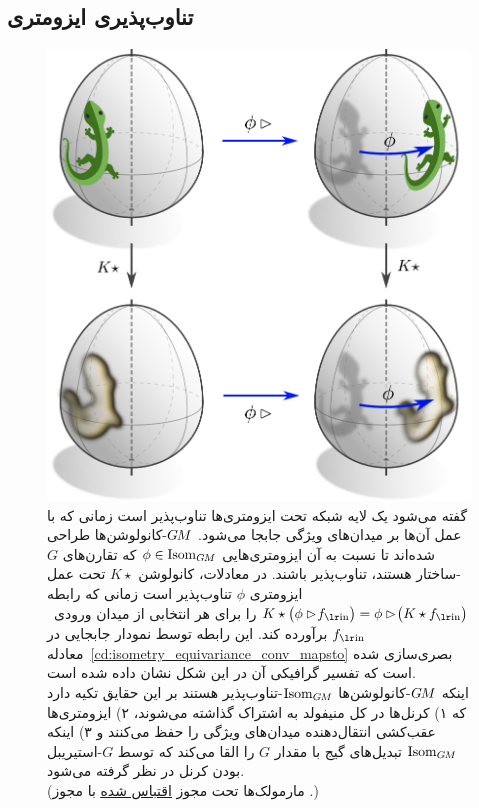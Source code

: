

\subsection{تناوب‌پذیری ایزومتری}
\label{sec:gauge_conv_isom_equiv}


\begin{figure}
	\centering
	\includegraphics[width=.56\textwidth]{figures/lizard_conv_egg.pdf}
	\captionsetup{width=.89\textwidth}
	\caption[]{\small
		گفته می‌شود یک لایه شبکه تحت ایزومتری‌ها تناوب‌پذیر است زمانی که با عمل آن‌ها بر میدان‌های ویژگی جابجا می‌شود.
		$G\mkern-1.4muM$-کانولوشن‌ها طراحی شده‌اند تا نسبت به آن ایزومتری‌هایی $\phi\in \operatorname{Isom}_{G\mkern-1.4muM}$ که تقارن‌های $G$-ساختار هستند، تناوب‌پذیر باشند.
		در معادلات، کانولوشن $K\star$ تحت عمل ایزومتری $\phi$ تناوب‌پذیر است زمانی که رابطه
		$K \star \big( \phi\rhd\! \fin \big) = \phi\rhd\! \big(K \star \fin \big)$
		را برای هر انتخابی از میدان ورودی~$\fin$ برآورده کند.
		این رابطه توسط نمودار جابجایی در معادله~\eqref{cd:isometry_equivariance_conv_mapsto} بصری‌سازی شده است که تفسیر گرافیکی آن در این شکل نشان داده شده است.
		\\[1ex]
		اینکه $G\mkern-1.4muM$-کانولوشن‌ها $\operatorname{Isom}_{G\mkern-1.4muM}$-تناوب‌پذیر هستند بر این حقایق تکیه دارد که
		۱) کرنل‌ها در کل منیفولد به اشتراک گذاشته می‌شوند،
		۲) ایزومتری‌ها عقب‌کشی انتقال‌دهنده میدان‌های ویژگی را حفظ می‌کنند و
		۳) اینکه $\operatorname{Isom}_{G\mkern-1.4muM}$ تبدیل‌های گیج با مقدار $G$ را القا می‌کند که توسط $G$-استیریبل بودن کرنل در نظر گرفته می‌شود.
		{\\
			\color{gray}
			\scriptsize
			(مارمولک‌ها تحت مجوز 
			\href{https://github.com/twitter/twemoji/blob/gh-pages/LICENSE-GRAPHICS}{\underline{اقتباس شده}}
			با مجوز .)
		}
		\\[0ex]
	}
	\label{fig:lizard_conv_egg}
\end{figure}


